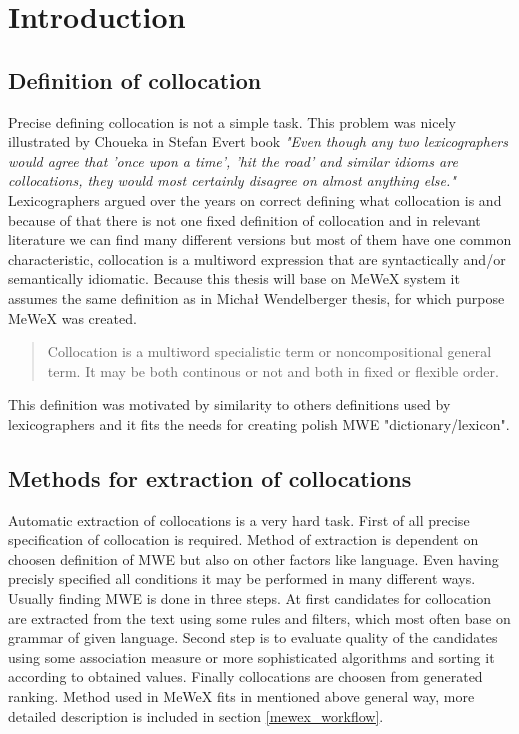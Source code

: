 
\chapter{Introduction}

\section{Definition of collocation}


Precise defining collocation is not a simple task. This problem was nicely illustrated by Choueka in Stefan Evert book 
\textit{"Even though any two lexicographers would agree that ’once upon a time’, ’hit the road’ and similar idioms are collocations,
they would most certainly disagree on almost anything else."}
Lexicographers argued over the years on correct defining what collocation is and because of that there is not one fixed definition of collocation  
and in relevant literature we can find many different versions but most of them have one common characteristic, 
collocation is a multiword expression that are syntactically and/or semantically idiomatic. Because this thesis will base on MeWeX system 
it assumes the same definition as in Michał Wendelberger thesis, for which purpose MeWeX was created.
\begin{quote}
    Collocation is a multiword specialistic term or noncompositional general term. 
    It may be both continous or not and both in fixed or flexible order.
    \cite{mgr}
\end{quote}
This definition was motivated by similarity to others definitions used by lexicographers and it fits the needs for creating polish MWE "dictionary/lexicon". 

\section{Methods for extraction of collocations} \label{extraction_method}
Automatic extraction of collocations is a very hard task. First of all precise specification of collocation is required.
Method of extraction is dependent on choosen definition of MWE but also on other factors like language. 
Even having precisly specified all conditions it may be performed in many different ways. 
Usually finding MWE is done in three steps. At first candidates for collocation are extracted from the text using some rules and filters, 
which most often base on grammar of given language. Second step is to evaluate quality of the candidates 
using some association measure or more sophisticated algorithms and sorting it according to obtained values. 
Finally collocations are choosen from generated ranking. Method used in MeWeX fits in mentioned above general way, 
more detailed description is included in section \ref{mewex_workflow}.

